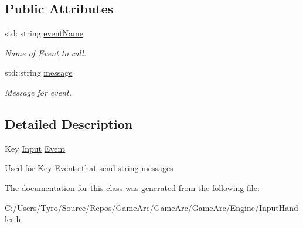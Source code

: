 \subsection*{Public Attributes}
\begin{DoxyCompactItemize}
\item 
\mbox{\label{class_key_input_event_aaea5ec49ffe2e60d40401473e2ed16c6}} 
std\+::string \mbox{\hyperlink{class_key_input_event_aaea5ec49ffe2e60d40401473e2ed16c6}{event\+Name}}
\begin{DoxyCompactList}\small\item\em Name of \mbox{\hyperlink{class_event}{Event}} to call. \end{DoxyCompactList}\item 
\mbox{\label{class_key_input_event_aa84df12c9e4630625f4ad926eabe1cc9}} 
std\+::string \mbox{\hyperlink{class_key_input_event_aa84df12c9e4630625f4ad926eabe1cc9}{message}}
\begin{DoxyCompactList}\small\item\em Message for event. \end{DoxyCompactList}\end{DoxyCompactItemize}


\subsection{Detailed Description}
Key \mbox{\hyperlink{class_input}{Input}} \mbox{\hyperlink{class_event}{Event}}

Used for Key Events that send string messages 

The documentation for this class was generated from the following file\+:\begin{DoxyCompactItemize}
\item 
C\+:/\+Users/\+Tyro/\+Source/\+Repos/\+Game\+Arc/\+Game\+Arc/\+Game\+Arc/\+Engine/\mbox{\hyperlink{_input_handler_8h}{Input\+Handler.\+h}}\end{DoxyCompactItemize}
